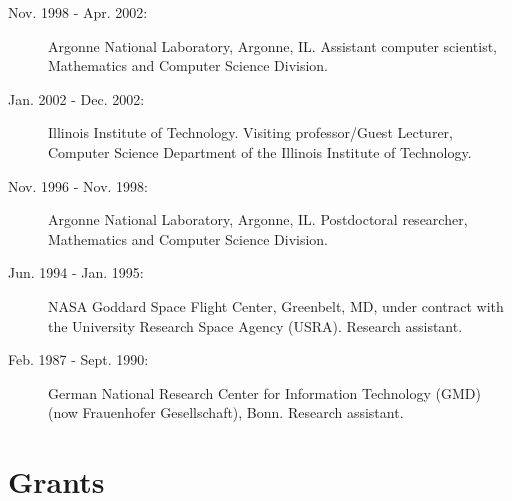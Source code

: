 \documentclass{article}
\begin{document}
\begin{description}
\item[Nov. 1998 - Apr. 2002:] 	Argonne National Laboratory, Argonne, IL. Assistant computer scientist, 
				Mathematics and Computer Science Division. 

\item[Jan. 2002 - Dec. 2002:] 	Illinois Institute of Technology. Visiting professor/Guest Lecturer,   
   				Computer Science Department of the Illinois Institute of Technology. 

\item[Nov. 1996 - Nov. 1998:] 	Argonne National Laboratory, Argonne, IL. Postdoctoral researcher, 
  	   			Mathematics and Computer Science Division. 

\item[Jun. 1994 - Jan. 1995:] 	NASA Goddard Space Flight Center, Greenbelt, MD, under contract 
  	   			with the University Research Space Agency (USRA). Research assistant. 

\item[Feb. 1987 - Sept. 1990:] 	German National Research Center for Information Technology   
   				(GMD) (now Frauenhofer Gesellschaft), Bonn. Research assistant. 

\end{description}



\section{Grants}
\end{document}
